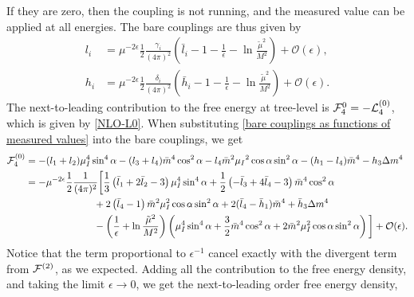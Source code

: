 If they are zero, then the coupling is not running, and the measured value can be applied at all energies.
The bare couplings are thus given by
\begin{align}
    \label{bare couplings as functions of measured values}
    l_i &= \mu^{-2\epsilon} \frac{1}{2} \frac{\gamma_i}{(4 \pi)^2}
    \left(
        \bar l_i -1- \frac{1}{\epsilon} - \ln\frac{\tilde \mu^2}{M^2}
    \right)+ \mathcal{O}(\epsilon), \\
    h_i &= \mu^{-2\epsilon} \frac{1}{2} \frac{\delta_i}{(4 \pi)^2}
    \left(
        \bar h_i - 1 - \frac{1}{\epsilon} - \ln\frac{\tilde \mu^2}{M^2}
    \right)
    + \mathcal{O}(\epsilon).
\end{align}
%
The next-to-leading contribution to the free energy at tree-level is $\mathcal{F}_4^{0} = - \mathcal{L}_4^{(0)}$, which is given by \cref{NLO-L0}.
When substituting \cref{bare couplings as functions of measured values} into the bare couplings, we get
\begin{align*}
    \mathcal{F}^{(0)}_4
    & = 
    - (l_1 + l_2)\mu_I^4 \sin^4{\alpha}
    - (l_3 + l_4)\bar m^4 \cos^2{\alpha}
    - l_4 \bar m^2 \mu_I{}^2 \cos{\alpha} \sin^2{\alpha}
    -(h_1- l_4) \bar m^4
    - h_3 \Delta m^4
    \\
    & = 
    - \mu^{-2 \epsilon} \frac{1}{2} \frac{1}{(4 \pi)^2}
    \bigg[
        \frac{1}{3}
        \left( 
            \bar l_1 + 2 \bar l_2 - 3
        \right) \mu_I^4 \sin^4 \alpha
        +
        \frac{1}{2}
        \left(
            - \bar l_3 + 4 \bar l_4 - 3
        \right) \bar m^4 \cos^2\alpha
        \\
        & \quad \quad \quad \quad \quad \quad \quad
        + 2 \left(\bar l_4 - 1\right)
        \bar m^2 \mu_I^2 \cos\alpha \sin^2 \alpha
        + 2 (\bar l_4 - \bar h_1) \bar m^4
        + \bar h_3 \Delta m^4
        \\
        & \quad \quad \quad \quad \quad \quad \quad
        - 
        \left(\frac{1}{\epsilon} + \ln \frac{\tilde \mu^2}{M^2}\right) 
        \left(
            \mu_I^4\sin^4\alpha + \frac{3}{2} \bar m^4 \cos^2 \alpha
            + 2 \bar m^2 \mu_I^2 \cos\alpha \sin^2 \alpha
        \right) 
    \bigg] + \mathcal{O}(\epsilon).
\end{align*}
Notice that the term proportional to $\epsilon^{-1}$ cancel exactly with the divergent term from $\mathcal{F}^{(2)}$, as we expected.
Adding all the contribution to the free energy density, and taking the limit $\epsilon \rightarrow 0$, we get the next-to-leading order free energy density,
